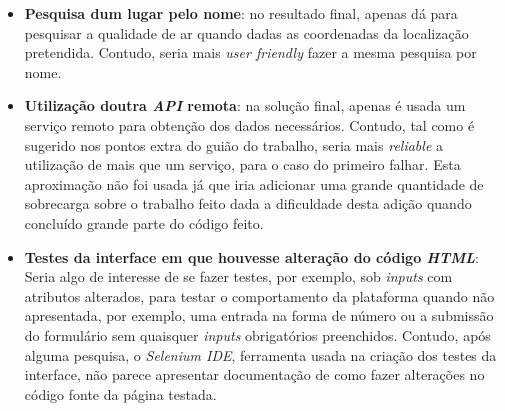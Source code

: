 \begin{itemize}
   \item \textbf{Pesquisa dum lugar pelo nome}: no resultado final, apenas dá para pesquisar a qualidade de 
ar quando dadas as coordenadas da localização pretendida. Contudo, seria mais \textit{user friendly} fazer a mesma
pesquisa por nome.
   \item \textbf{Utilização doutra \textit{API} remota}: na solução final, apenas é usada um serviço remoto para
obtenção dos dados necessários. Contudo, tal como é sugerido nos pontos extra do guião do trabalho, seria mais
\textit{reliable} a utilização de mais que um serviço, para o caso do primeiro falhar. Esta aproximação não foi usada
já que iria adicionar uma grande quantidade de sobrecarga sobre o trabalho feito dada a dificuldade desta adição 
quando concluído grande parte do código feito.
   \item \textbf{Testes da interface em que houvesse alteração do código \textit{HTML}}: Seria algo de interesse de se
fazer testes, por exemplo, sob \textit{inputs} com atributos alterados, para testar o comportamento da plataforma
quando não apresentada, por exemplo, uma entrada na forma de número ou a submissão do formulário sem quaisquer 
\textit{inputs} obrigatórios preenchidos. Contudo, após alguma pesquisa, o \textit{Selenium IDE}, ferramenta usada
na criação dos testes da interface, não parece apresentar documentação de como fazer alterações no código fonte da
página testada.
\end{itemize}
